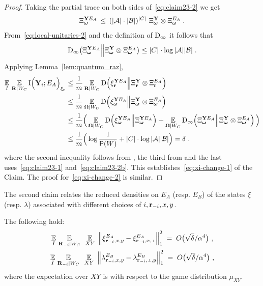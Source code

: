 \begin{proof}
Taking the partial trace on both sides of~\eqref{eq:claim23-2} we get
\begin{align}
\label{eq:local-unitaries-2}
\Xi_{\boldsymbol{\omega}}^{\mathbf{Y} E_A} \,\leq\, (|\mathcal{A}|\cdot |\mathcal{B}|)^{|C|} \,\, \Xi_{{\boldsymbol{\omega}}}^{\mathbf{Y}} \otimes \Xi_{{\boldsymbol{\omega}}}^{E_A}\;.
\end{align}
	From~\eqref{eq:local-unitaries-2} and the definition of $\mathrm{D}_\infty$ it follows that 
	\begin{equation}\label{eq:claim23-2b}
	\mathrm{D}_\infty \big (\Xi_{{\boldsymbol{\omega}}}^{\mathbf{Y} E_A} \Big \| \Xi_{{\boldsymbol{\omega}}}^{\mathbf{Y}} \otimes \Xi_{{\boldsymbol{\omega}}}^{E_A} \big ) \leq |C| \cdot \log |\mathcal{A}| |\mathcal{B}|\;.
	\end{equation}
Applying Lemma~\ref{lem:quantum_raz},
\begin{align*}
		\operatorname*{\mathbb{E}}_I \,  \operatorname*{\mathbb{E}}_{\mathbf{R} | W_C} \mathrm{I} \Big (\mathbf{Y}_i ; E_A\Big )_{\xi_{\mathbf{r}}} &\leq 		\frac{1}{m} \operatorname*{\mathbb{E}}_{\mathbf{R} | W_C} \mathrm{D} \Big (\xi_{\mathbf{r}}^{\mathbf{Y} E_A} \Big \| \Xi_{\mathbf{r}}^{\mathbf{Y}} \otimes \Xi_{\mathbf{r}}^{E_A} \Big )\notag\\
		&\leq \frac{1}{m} \operatorname*{\mathbb{E}}_{{\boldsymbol{\Omega}} | W_C} \mathrm{D} \Big (\xi_{{\boldsymbol{\omega}}}^{\mathbf{Y} E_A} \Big \| \Xi_{{\boldsymbol{\omega}}}^{\mathbf{Y}} \otimes \Xi_{{\boldsymbol{\omega}}}^{E_A} \Big )\notag \\
		&\leq 		\frac{1}{m} \Big(\operatorname*{\mathbb{E}}_{{\boldsymbol{\Omega}} | W_C} \mathrm{D} \Big (\xi_{{\boldsymbol{\omega}}}^{\mathbf{Y} E_A} \Big \| \Xi_{{\boldsymbol{\omega}}}^{\mathbf{Y} E_A} \Big) + \operatorname*{\mathbb{E}}_{{\boldsymbol{\Omega}} | W_C} \mathrm{D}_\infty \Big (\Xi_{{\boldsymbol{\omega}}}^{\mathbf{Y} E_A} \Big \| \Xi_{{\boldsymbol{\omega}}}^{\mathbf{Y}} \otimes \Xi_{{\boldsymbol{\omega}}}^{E_A} \Big) \, \Big)\notag\\
		&\leq \frac{1}{m}\Big(\log \frac{1}{\mathsf{P}(W)} +  |C| \cdot \log |\mathcal{A}| |\mathcal{B}|\Big) = \delta~.
\end{align*}
where the second inequality follows from , the third from  and the last uses~\eqref{eq:claim23-1} and~\eqref{eq:claim23-2b}. This establishes~\eqref{eq:xi-change-1} of the Claim. The proof for~\eqref{eq:xi-change-2} is similar.
\end{proof}

The second claim relates the reduced densities on $E_A$ (resp. $E_B$) of the states $\xi$ (resp. $\lambda$) associated with different choices of $i,\mathbf{r}_{-i},x,y$. 

\begin{claim}\label{claim:xi-change-y}
The following hold:
\begin{gather}
\Ex_I \, \Ex_{\bR_\mi |  W_C} \, \, \, \Ex_{XY} \,\, \Big \| \xi^{E_A}_\ssxy - \xi^{E_A}_\ssxp \Big \|_1^2\; = \; O\big(\sqrt{\delta}/\alpha^4 \big)~, \label{eq:E_A_1} \\
\Ex_I \, \Ex_{\bR_\mi |  W_C} \, \, \, \Ex_{XY} \,\, \Big \| \lambda^{E_B}_\ssxy - \lambda^{E_B}_\sspy \Big \|_1^2\; = \; O\big(\sqrt{\delta}/\alpha^4 \big)~, \label{eq:E_A_2}
\end{gather}
where the expectation over $XY$ is with respect to the game distribution $\mu_{XY}$. 
\end{claim}

